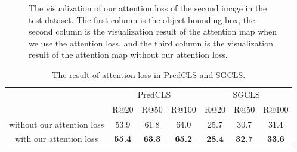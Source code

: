 \begin{figure}[H]
{\begin{minipage}[t]{5cm}
	\end{minipage}}
	
	\caption[The visualization of our attention loss of the second image in the test dataset]{The visualization of our attention loss of the second image in the test dataset. The first column is the object bounding box, the second column is the visualization result of the attention map when we use the attention loss, and the third column is the visualization result of the attention map without our attention loss.}
	\label{fig:bus}
\end{figure}


\begin{table}[!h]
	\centering
	\begin{tabular}{c|ccc|ccc}
		\hline
		\multirow{2}{*}{}           & \multicolumn{3}{c|}{PredCLS} & \multicolumn{3}{c}{SGCLS} \\ \cline{2-7} 
		& R@20    & R@50    & R@100    & R@20   & R@50   & R@100   \\ \hline
		without our attention  loss & 53.9      & 61.8       & 64.0       & 25.7     & 30.7     & 31.4   \\
		with our attention loss     & \textbf{55.4}       & \textbf{63.3}       & \textbf{65.2 }       & \textbf{28.4 }     & \textbf{32.7}      &\textbf{33.6}     \\ \hline
	\end{tabular}
	
	\caption[The result of attention loss in PredCLS and SGCLS]{The result of attention loss in PredCLS and SGCLS.}
	\label{tab:result_attetnion_loss}
\end{table}


